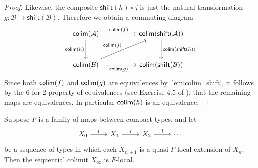 \begin{proof}
Likewise, the composite $\mathsf{shift}(h) \circ j$ is just the natural transformation $g:\mathcal{B}\to \mathsf{shift}(\mathcal{B})$. Therefore we obtain a commuting diagram
\begin{equation*}
\begin{tikzcd}[column sep=huge,row sep=large]
\mathsf{colim}(\mathcal{A}) \arrow[d,swap,"\mathsf{colim}(h)"] \arrow[r,"\mathsf{colim}(f)"] & \mathsf{colim}(\mathsf{shift}(\mathcal{A})) \arrow[d,"\mathsf{colim}(\mathsf{shift}(h))"] \\
\mathsf{colim}(\mathcal{B}) \arrow[r,swap,"\mathsf{colim}(g)"] \arrow[ur,"\mathsf{colim}(j)"] & \mathsf{colim}(\mathsf{shift}(\mathcal{B}))
\end{tikzcd}
\end{equation*}
Since both $\mathsf{colim}(f)$ and $\mathsf{colim}(g)$ are equivalences by \cref{lem:colim_shift}, it follows by the 6-for-2 property of equivalences (see Exercise 4.5 of \cite{hottbook}), that the remaining maps are equivalences. In particular $\mathsf{colim}(h)$ is an equivalence. 
\end{proof}

\begin{prp}\label{prp:colim_local}
Suppose $F$ is a family of maps between compact types, and let
\begin{equation*}
\begin{tikzcd}
X_0 \arrow[r,"l"] & X_1 \arrow[r,"l"] & X_2 \arrow[r,"l"] & \cdots
\end{tikzcd}
\end{equation*}
be a sequence of types in which each $X_{n+1}$ is a quasi $F$-local extension of $X_n$. Then the sequential colimit $X_\infty$ is $F$-local.
\end{prp}

